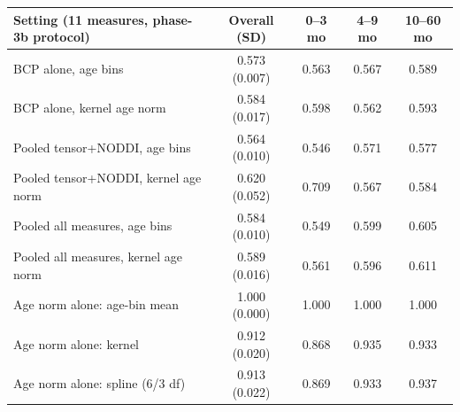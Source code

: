 \begin{tabular}{lcccc}
\toprule
Setting (11 measures, phase-3b protocol) & Overall (SD) & 0--3 mo & 4--9 mo & 10--60 mo \\
\midrule
BCP alone, age bins & 0.573 (0.007) & 0.563 & 0.567 & 0.589 \\
BCP alone, kernel age norm & 0.584 (0.017) & 0.598 & 0.562 & 0.593 \\
Pooled tensor+NODDI, age bins & 0.564 (0.010) & 0.546 & 0.571 & 0.577 \\
Pooled tensor+NODDI, kernel age norm & 0.620 (0.052) & 0.709 & 0.567 & 0.584 \\
Pooled all measures, age bins & 0.584 (0.010) & 0.549 & 0.599 & 0.605 \\
Pooled all measures, kernel age norm & 0.589 (0.016) & 0.561 & 0.596 & 0.611 \\
Age norm alone: age-bin mean & 1.000 (0.000) & 1.000 & 1.000 & 1.000 \\
Age norm alone: kernel & 0.912 (0.020) & 0.868 & 0.935 & 0.933 \\
Age norm alone: spline (6/3 df) & 0.913 (0.022) & 0.869 & 0.933 & 0.937 \\
\bottomrule
\end{tabular}
